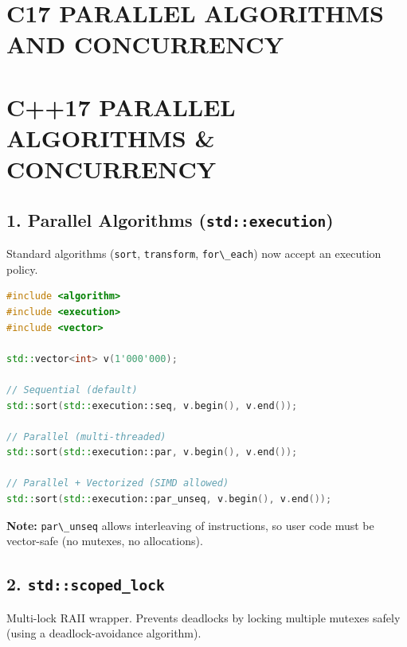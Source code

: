 \hypertarget{c17-parallel-algorithms-and-concurrency}{%
\chapter{C17 PARALLEL ALGORITHMS AND
CONCURRENCY}\label{c17-parallel-algorithms-and-concurrency}}

\hypertarget{c17-parallel-algorithms-concurrency}{%
\chapter{C++17 PARALLEL ALGORITHMS \&
CONCURRENCY}\label{c17-parallel-algorithms-concurrency}}

\hypertarget{parallel-algorithms-stdexecution}{%
\section{\texorpdfstring{1. Parallel Algorithms
(\texttt{std::execution})}{1. Parallel Algorithms (std::execution)}}\label{parallel-algorithms-stdexecution}}

Standard algorithms (\passthrough{\lstinline!sort!},
\passthrough{\lstinline!transform!},
\passthrough{\lstinline!for\_each!}) now accept an execution policy.

\begin{lstlisting}[language={C++}]
#include <algorithm>
#include <execution>
#include <vector>

std::vector<int> v(1'000'000);

// Sequential (default)
std::sort(std::execution::seq, v.begin(), v.end());

// Parallel (multi-threaded)
std::sort(std::execution::par, v.begin(), v.end());

// Parallel + Vectorized (SIMD allowed)
std::sort(std::execution::par_unseq, v.begin(), v.end());
\end{lstlisting}

\textbf{Note:} \passthrough{\lstinline!par\_unseq!} allows interleaving
of instructions, so user code must be vector-safe (no mutexes, no
allocations).

\hypertarget{stdscoped_lock}{%
\section{\texorpdfstring{2.
\texttt{std::scoped\_lock}}{2. std::scoped\_lock}}\label{stdscoped_lock}}

Multi-lock RAII wrapper. Prevents deadlocks by locking multiple mutexes
safely (using a deadlock-avoidance algorithm).


